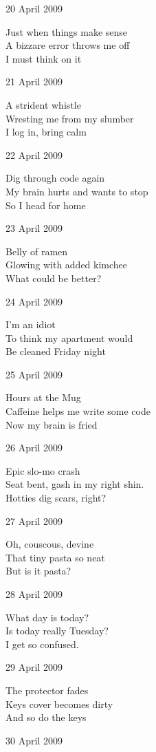 \documentclass[12pt]{article}
\begin{document}
20 April 2009

Just when things make sense \\
A bizzare error throws me off \\
I must think on it

21 April 2009

A strident whistle \\
Wresting me from my slumber \\
I log in, bring calm

22 April 2009

Dig through code again \\
My brain hurts and wants to stop \\
So I head for home

23 April 2009

Belly of ramen \\
Glowing with added kimchee \\
What could be better?

\newpage

24 April 2009

I'm an idiot \\
To think my apartment would \\
Be cleaned Friday night

25 April 2009

Hours at the Mug \\
Caffeine helps me write some code \\
Now my brain is fried

26 April 2009

Epic slo-mo crash \\
Seat bent, gash in my right shin. \\
Hotties dig scars, right?

27 April 2009

Oh, couscous, devine \\
That tiny pasta so neat \\
But is it pasta?

28 April 2009

What day is today? \\
Is today really Tuesday? \\
I get so confused.

29 April 2009

The protector fades \\
Keys cover becomes dirty \\
And so do the keys

30 April 2009
\end{document}

